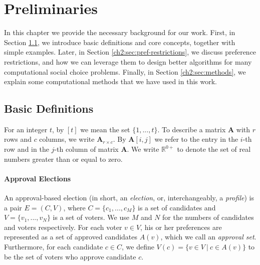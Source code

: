 \chapter{Preliminaries}

\ifpdf
    \graphicspath{{Chapter2/Figs/Raster/}{Chapter2/Figs/PDF/}{Chapter2/Figs/}}
\else
    \graphicspath{{Chapter2/Figs/Vector/}{Chapter2/Figs/}}
\fi

In this chapter we provide the necessary background for our work.
First, in Section \ref{sec:basic-def}, we introduce basic definitions and core concepts, together with simple examples.
Later, in Section \ref{ch2:sec:pref-restrictions}, we discuss preference restrictions,
and how we can leverage them to design better algorithms for many computational social choice problems.
Finally, in Section \ref{ch2:sec:methods}, we explain some computational methods that we have used in this work.

\section{Basic Definitions}\label{sec:basic-def}

For an integer $t$, by $[t]$ we mean the set $\{1,...,t\}$.
To describe a matrix $\mathbf{A}$ with $r$ rows and $c$ columns, we write $\mathbf{A}_{r \times c}$.
By $\mathbf{A}[i,j]$ we refer to the entry in the $i$-th row and in the $j$-th column of matrix $\mathbf{A}$.
We write $\mathbb{R}^{0+}$ to denote the set of real numbers greater than or equal to zero.

\subsubsection{Approval Elections}

An approval-based election (in short, an \textit{election}, or, interchangeably, a \textit{profile}) is a pair $E = (C, V)$, where 
$C = \{c_1,...,c_M\}$ is a set of candidates and  $V = \{v_1,...,v_N\}$ is a set of voters.
We use $M$ and $N$ for the numbers of candidates and voters respectively. 
For each voter $v \in V$, his or her preferences are represented as a set of approved candidates $A(v)$,
which we call an \textit{approval set}.\footnotemark
Furthermore, for each candidate $c \in C$, we define $V(c) = \{v \in V \:|\: c \in A(v)\}$
to be the set of voters who approve candidate $c$.

